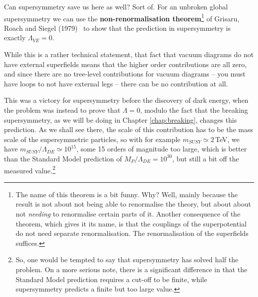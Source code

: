 \documentclass[notes.tex]{subfiles}
\begin{document}
Can supersymmetry save us here as well? Sort of. For an unbroken global supersymmetry we can use the {\bf non-renormalisation theorem}\footnote{The name of this theorem is a bit funny. Why? Well, mainly because the result is not about not being able to renormalise the theory, but about about not {\it needing} to renormalise certain parts of it. Another consequence of the theorem, which gives it its name, is that the couplings of the superpotential do not need separate renormalisation. The renormalisation of the superfields suffices.}
of Grisaru, Roach and Siegel (1979)~\cite{Grisaru:1979wc} to show that the prediction in supersymmetry is exactly $\Lambda_{VE} = 0$.


While this is a rather technical statement, that fact that vacuum diagrams do not have external superfields means that the higher order contributions are all zero, and since there are no tree-level contributions for vacuum diagrams -- you must have loops to not have external legs -- there can be no contribution at all. 

This was a victory for supersymmetry before the discovery of dark energy, when the problem was instead to prove that $\Lambda=0$, modulo the fact that the breaking supersymmetry, as we will be doing in Chapter \ref{chap:breaking}, changes this prediction. As we shall see there, the scale of this contribution has to be the mass scale of the supersymmetric particles, so with for example $m_{SUSY} \simeq 2$\,TeV, we have $m_{SUSY}/\Lambda_{DE} \simeq 10^{15}$, some 15 orders of magnitude too large, which is better than the Standard Model prediction of $M_P/\Lambda_{DE} = 10^{30}$, but still a bit off the measured value.\footnote{So, one would be tempted to say that supersymmetry has solved half the problem. On a more serious note, there is a significant difference in that the Standard Model prediction requires a cut-off to be finite, while supersymmetry predicts a finite but too large value.}
\end{document}
